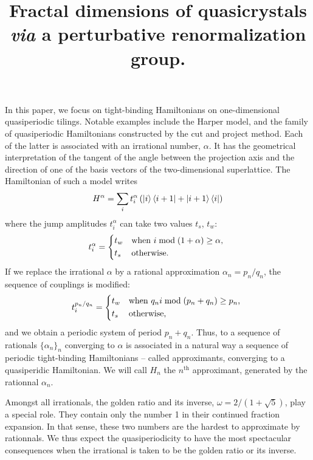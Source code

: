 \documentclass[11pt]{article}
\title{\textbf{Fractal dimensions of quasicrystals \emph{via} a perturbative renormalization group.}}
\author{}
\date{}
\begin{document}

\maketitle

\abstract{}

In this paper, we focus on tight-binding Hamiltonians on one-dimensional quasiperiodic tilings.
Notable examples include the Harper model, and the family of quasiperiodic Hamiltonians constructed by the cut and project method. 
Each of the latter is associated with an irrational number, $\alpha$.
It has the geometrical interpretation of the tangent of the angle between the projection axis and the direction of one of the basis vectors of the two-dimensional superlattice.
The Hamiltonian of such a model writes
\begin{equation}
	H^\alpha = \sum_i t^\alpha_i \left( \ket{i} \bra{i+1} + \ket{i+1} \bra{i} \right)
\end{equation}
where the jump amplitudes $t^\alpha_i$ can take two values $t_s$, $t_w$:
\begin{equation}
	t_i^\alpha = \begin{dcases*}
	t_w & when $i \bmod(1+\alpha) \geq \alpha$, \\
	t_s & otherwise.
	\end{dcases*}
\end{equation}
If we replace the irrational $\alpha$ by a rational approximation $\alpha_n = p_n/q_n$, the sequence of couplings is modified:
\begin{equation}
	t_i^{p_n/q_n} = \begin{dcases*}
	t_w & when $q_n i \bmod(p_n+q_n) \geq p_n$, \\
	t_s & otherwise,
	\end{dcases*}
\end{equation}
and we obtain a periodic system of period $p_n + q_n$. 
Thus, to a sequence of rationals $\{\alpha_n\}_n$ converging to $\alpha$ is associated in a natural way a sequence of periodic tight-binding Hamiltonians -- called approximants, converging to a quasiperidic Hamiltonian. We will call $H_n$ the $n^\text{th}$ approximant, generated by the rationnal $\alpha_n$.


Amongst all irrationals, the golden ratio and its inverse, $\omega = 2/(1+\sqrt{5})$, play a special role. They contain only the number 1 in their continued fraction expansion. In that sense, these two numbers are the hardest to approximate by rationnals. 
We thus expect the quasiperiodicity to have the most spectacular consequences when the irrational is taken to be the golden ratio or its inverse.
\end{document}
